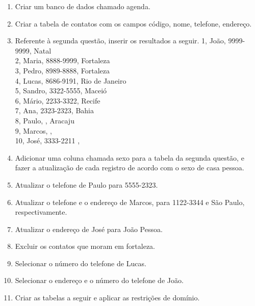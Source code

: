 \documentclass[11pt]{article}
\begin{document}
	\begin{enumerate}
		\item Criar um banco de dados chamado agenda.
		
		\item Criar a tabela de contatos com os campos código, nome, telefone, endereço.
		
		\item Referente à segunda questão, inserir os resultados a seguir.
		1, João, 9999-9999, Natal\\
		2, Maria, 8888-9999, Fortaleza\\
		3, Pedro, 8989-8888, Fortaleza\\
		4, Lucas, 8686-9191, Rio de Janeiro\\
		5, Sandro, 3322-5555, Maceió\\
		6, Mário, 2233-3322, Recife\\
		7, Ana, 2323-2323, Bahia\\
		8, Paulo, , Aracaju\\
		9, Marcos, ,\\
		10, José, 3333-2211 ,\\
		
		\item Adicionar uma coluna chamada sexo para a tabela da segunda questão, e fazer a atualização de
		cada registro de acordo com o sexo de casa pessoa.
		
		\item Atualizar o telefone de Paulo para 5555-2323.
		
		\item Atualizar o telefone e o endereço de Marcos, para 1122-3344 e São Paulo, respectivamente.
		
		\item Atualizar o endereço de José para João Pessoa.
		
		\item Excluir os contatos que moram em fortaleza.
		
		\item Selecionar o número do telefone de Lucas.
		
		\item Selecionar o endereço e o número do telefone de João.
		
		\item Criar as tabelas a seguir e aplicar as restrições de domínio.
		

\end{enumerate}
\end{document}
